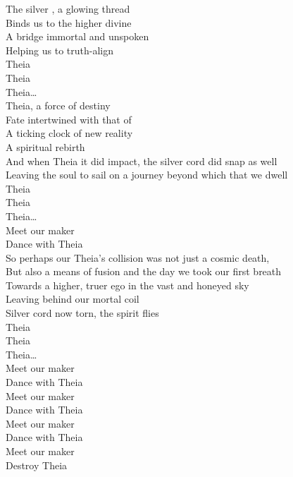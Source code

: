 



The silver , a glowing thread \\
Binds us to the higher divine \\
A bridge immortal and unspoken \\
Helping us to truth-align \\

Theia \\
Theia \\
Theia… \\

Theia, a force of destiny \\
Fate intertwined with that of  \\
A ticking clock of new reality \\
A spiritual rebirth \\
And when Theia it did impact, the silver cord did snap as well \\
Leaving the soul to sail on a journey beyond which that we dwell \\

Theia \\
Theia \\
Theia… \\

Meet our maker \\
Dance with Theia \\

So perhaps our Theia's collision was not just a cosmic death, \\
But also a means of fusion and the day we took our first breath \\
Towards a higher, truer ego in the vast and honeyed sky \\
Leaving behind our mortal coil \\
Silver cord now torn, the spirit flies \\

Theia \\
Theia \\
Theia… \\

Meet our maker \\
Dance with Theia \\
Meet our maker \\
Dance with Theia \\
Meet our maker \\
Dance with Theia \\
Meet our maker \\
Destroy Theia \\

